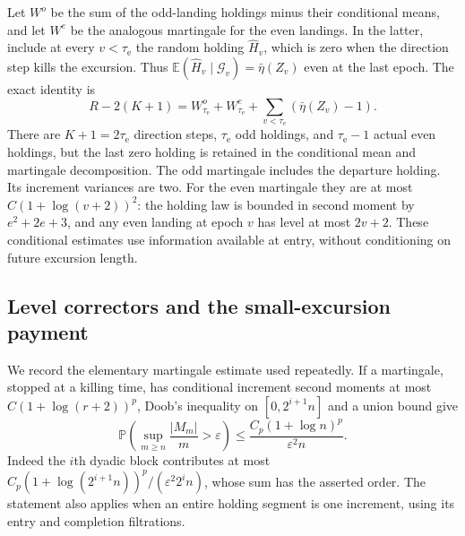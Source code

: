 \documentclass[11pt]{amsart}
\theoremstyle{definition}
\theoremstyle{remark}
\newcommand{\E}{\mathbb E}
\newcommand{\PP}{\mathbb P}
\begin{document}
Let $W^o$ be the sum of the odd-landing holdings minus their conditional
means, and let $W^e$ be the analogous martingale for the even landings.
In the latter, include at every $v<\tau_{\mathrm e}$ the random holding
$\widehat H_v$, which is zero when the direction step kills the excursion.
Thus $\E(\widehat H_v\mid\mathcal G_v)=\bar\eta(Z_v)$ even at the
last epoch. The exact identity is
\begin{equation}\label{clk:decomposition}
 R-2(K+1)=W^o_{\tau_{\mathrm e}}+W^e_{\tau_{\mathrm e}}+
                  \sum_{v<\tau_{\mathrm e}}(\bar\eta(Z_v)-1).
\end{equation}
There are $K+1=2\tau_{\mathrm e}$ direction steps, $\tau_{\mathrm e}$ odd holdings, and $\tau_{\mathrm e}-1$ actual
even holdings, but the last zero holding is retained in the conditional
mean and martingale decomposition. The odd martingale includes the
departure holding. Its increment variances are two. For the even
martingale they are at most $C(1+\log(v+2))^2$: the holding law is
bounded in second moment by $e^2+2e+3$, and any even landing at epoch
$v$ has level at most $2v+2$. These conditional estimates use information
available at entry, without conditioning on future excursion length.

\subsection{Level correctors and the small-excursion payment}

We record the elementary martingale estimate used repeatedly. If a
martingale, stopped at a killing time, has conditional increment second
moments at most $C(1+\log(r+2))^p$, Doob's inequality on
$[0,2^{i+1}n]$ and a union bound give
\begin{equation}\label{clk:doob}
 \PP\left(\sup_{m\ge n}\frac{|M_m|}{m}>\varepsilon\right)
 \le \frac{C_p(1+\log n)^p}{\varepsilon^2n}.
\end{equation}
Indeed the $i$th dyadic block contributes at most
$C_p(1+\log(2^{i+1}n))^p/(\varepsilon^2 2^in)$, whose sum has
the asserted order. The statement also applies when an entire holding
segment is one increment, using its entry and completion filtrations.
\end{document}
